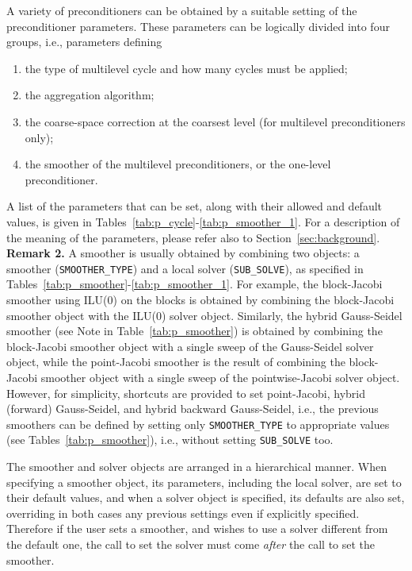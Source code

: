 A variety of preconditioners can be obtained
by a suitable setting of the preconditioner parameters. These parameters
can be logically divided into four groups, i.e., parameters defining
\begin{enumerate}
	\item the type of multilevel cycle and how many cycles must be applied;
        \item the aggregation algorithm;
        \item the coarse-space correction at the coarsest level (for multilevel
                 preconditioners only);
	\item the smoother of the multilevel preconditioners, or the one-level
                  preconditioner.
	
\end{enumerate}
A list of the parameters that can be set, along with their allowed and
default values, is given in Tables~\ref{tab:p_cycle}-\ref{tab:p_smoother_1}.
For a description of the meaning of the parameters, please
refer also to Section~\ref{sec:background}. \\

\textbf{Remark 2.} A smoother is usually obtained by combining two objects:
a smoother (\verb|SMOOTHER_TYPE|) and a local solver (\verb|SUB_SOLVE|),
as specified in Tables~\ref{tab:p_smoother}-\ref{tab:p_smoother_1}.
For example, the block-Jacobi smoother using
ILU(0) on the blocks is obtained by combining the block-Jacobi smoother
object with the ILU(0) solver object. Similarly,
the hybrid Gauss-Seidel smoother (see Note in Table~\ref{tab:p_smoother})
is obtained by combining the block-Jacobi smoother object with a single sweep
of the Gauss-Seidel solver object, while the point-Jacobi smoother is the
result of combining the block-Jacobi smoother object with a single sweep
of the pointwise-Jacobi solver object. However, for simplicity, shortcuts are
provided to set point-Jacobi, hybrid (forward) Gauss-Seidel, and
hybrid backward Gauss-Seidel, i.e., the previous smoothers can be defined
by setting only \verb|SMOOTHER_TYPE| to appropriate values (see
Tables~\ref{tab:p_smoother}), i.e., without setting
\verb|SUB_SOLVE| too.

The smoother and solver objects are arranged in a
hierarchical manner. When specifying a smoother object, its parameters,
including the local solver, are set to their default values, and when a solver
object is specified, its defaults are also set, overriding in both
cases any previous settings even if explicitly specified. Therefore if
the user sets a smoother, and wishes to use a solver
different from  the default one, the call to set the solver must come
\emph{after} the call to set the smoother. 

